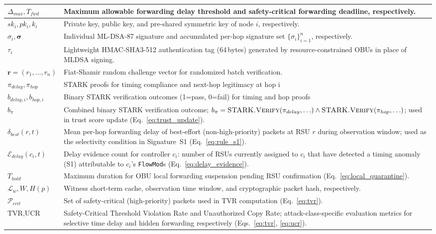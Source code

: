 \documentclass[12pt, a4paper]{report}
\begin{document}
\begin{longtable}{|m{5.0cm}|m{9.0cm}|}
\hline
$\Delta_{max}, T_{fwd}$ & Maximum allowable forwarding delay threshold and safety-critical forwarding deadline, respectively. \\
\hline
$sk_i, pk_i, k_i$ & Private key, public key, and pre-shared symmetric key of node $i$, respectively. \\
\hline
$\sigma_i, \boldsymbol{\sigma}$ & Individual ML-DSA-87 signature and accumulated per-hop signature set $\{\sigma_i\}_{i=1}^n$, respectively. \\
\hline
$\tau_i$ & Lightweight HMAC-SHA3-512 authentication tag (64\,bytes) generated by resource-constrained \ac{OBU}s in place of \ac{MLDSA} signing. \\
\hline
$\mathbf{r} = (r_1, \ldots, r_n)$ & Fiat-Shamir random challenge vector for randomized batch verification. \\
\hline
$\pi_{delay}, \pi_{hop}$ & STARK proofs for timing compliance and next-hop legitimacy at hop i \\
\hline
$b_{delay,i}, b_{hop,i}$ & Binary STARK verification outcomes (1=pass, 0=fail) for timing and hop proofs \\
\hline
$b_\pi$ & Combined binary STARK verification outcome; $b_\pi = \textsc{STARK.Verify}(\pi_{delay},\ldots) \land \textsc{STARK.Verify}(\pi_{hop},\ldots)$; used in trust score update (Eq.~\ref{eq:trust_update}). \\
\hline
$\delta_{best}(r,t)$ & Mean per-hop forwarding delay of best-effort (non-high-priority) packets at \ac{RSU} $r$ during observation window; used as the selectivity condition in Signature~S1 (Eq.~\ref{eq:rule_s1}). \\
\hline
$\mathcal{E}_{delay}(c_i,t)$ & Delay evidence count for controller $c_i$: number of \ac{RSU}s currently assigned to $c_i$ that have detected a timing anomaly (S1) attributable to $c_i$'s \texttt{FlowMod}s (Eq.~\ref{eq:delay_evidence}). \\
\hline
$T_{hold}$ & Maximum duration for \ac{OBU} local forwarding suspension pending \ac{RSU} confirmation (Eq.~\ref{eq:local_quarantine}). \\
\hline
$\mathcal{L}_w, W, H(p)$ & Witness short-term cache, observation time window, and cryptographic packet hash, respectively. \\
\hline
$\mathcal{P}_{crit}$ & Set of safety-critical (high-priority) packets used in TVR computation (Eq.~\ref{eq:tvr}). \\
\hline
$\text{TVR}, \text{UCR}$ & Safety-Critical Threshold Violation Rate and Unauthorized Copy Rate; attack-class-specific evaluation metrics for selective time delay and hidden forwarding respectively (Eqs.~\ref{eq:tvr}, \ref{eq:ucr}). \\

\end{longtable}
\end{document}
